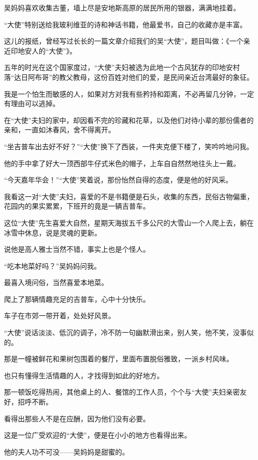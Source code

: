 \par 吴妈妈喜欢收集古董，墙上尽是安地斯高原的居民所用的银器，满满地挂着。
\par “大使”特别送给我玻利维亚的诗和神话书籍，他最爱书，自己的收藏亦是丰富。
\par 这儿的报纸，曾经写过长长的一篇文章介绍我们的吴“大使”，题目叫做：《一个亲近印地安人的“大使”》。
\par 五年的时光在这个国家度过，“大使”夫妇被选为此地一个古风犹存的印地安村落“达日阿布哥”的教父教母，这份百姓对他们的爱，是民间亲近台湾最好的象征。
\par 我是一个怕生而敏感的人，如果对方对我有些矜持和距离，不必再留几分钟，一定有理由可以逃掉。
\par 在“大使”夫妇的家中，却因看不完的珍藏和花草，以及他们对待小辈的那份儒者的亲和，一直如沐春风，舍不得离开。
\par “坐吉普车出去好不好？”“大使”换下了西装，一件夹克便下楼了，笑吟吟地问我。
\par 他的手中拿了好大一顶西部牛仔式米色的帽子，上车自自然然地往头上一戴。
\par “今天嘉年华会！”“大使”笑着说，那份怡然自得的态度，便是他的好风采。
\par 我看这一对“大使”夫妇，喜爱的不是书籍便是石头，收集的东西，民俗古物偏重，花园内的果实累累，下班开的竟是一辆吉普车。
\par 这位“大使”先生喜爱大自然，星期天海拔五千多公尺的大雪山一个人爬上去，躺在冰雪中休息，说是灵魂的更新。
\par 说他是高人雅士当然不错，事实上也是个怪人。
\par “吃本地菜好吗？”吴妈妈问我。
\par 最喜入境问俗，当然喜爱本地菜。
\par 爬上了那辆情趣充足的吉普车，心中十分快乐。
\par 车子在市郊一带开着，处处好风景。
\par “大使”说话淡淡、低沉的调子，冷不防一句幽默滑出来，别人笑，他不笑，没事似的。
\par 那是一幢被鲜花和果树包围着的餐厅，里面布置脱俗雅致，一派乡村风味。
\par 也只有懂得生活情趣的人，才找得到如此的好地方。
\par 那一顿饭吃得热闹，其他桌上的人、餐馆的工作人员，个个与“大使”夫妇亲密友好，招呼不断。
\par 看得出那些人不是在应酬，因为他们没有必要。
\par 这是一位广受欢迎的“大使”，便是在小小的地方也看得出来。
\par 他的夫人功不可没——吴妈妈是甜蜜的。
